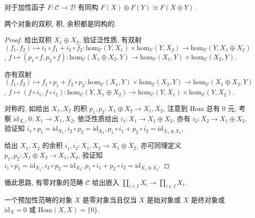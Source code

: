 \begin{lemma}
    对于加性函子 \(F : \mathcal{C} \to \mathcal{D}\) 有同构 \(F(X) \oplus F(Y) \cong F(X \oplus Y)\).
\end{lemma}

\begin{lemma}
    \label {lemma:coproduct product biproduct are isomorphic}
    两个对象的双积, 积, 余积都是同构的.

    \begin{proof}
        给出双积 \(X_1 \oplus X_2\), 验证泛性质, 有双射 \((f_1,f_2) \mapsto i_1 \circ f_1 + i_2 \circ f_2 : \mathrm{hom}_{\mathcal{C}} (Y,X_1) \times \mathrm{hom}_{\mathcal{C}} (Y,X_2) \to \mathrm{hom}_{\mathcal{C}} (Y,X_1 \oplus X_2)\),
        \(f \mapsto (p_1 \circ f, p_2 \circ f) : \mathrm{hom}_{\mathcal{C}} (X_1 \oplus X_2,Y) \to \mathrm{hom}_{\mathcal{C}} (X_1,Y) \times \mathrm{hom}_{\mathcal{C}} (X_2,Y)\).

        亦有双射 \((f_1,f_2) \mapsto f_1 \circ p_1 + f_2 \circ p_2 : \mathrm{hom}_{\mathcal{C}} (X_1,Y) \times \mathrm{hom}_{\mathcal{C}} (X_2,Y) \to \mathrm{hom}_{\mathcal{C}} (X_1 \oplus X_2,Y)\),
        \(f \mapsto (f \circ i_1, f \circ i_2) : \mathrm{hom}_{\mathcal{C}} (Y,X_1 \oplus X_2) \to \mathrm{hom}_{\mathcal{C}} (Y,X_1) \times \mathrm{hom}_{\mathcal{C}} (Y,X_2)\).

        对称的, 如给出 \(X_1,X_2\) 的积 \(p_1,p_2 : X_1 \oplus X_2 \to X_1,X_2\),
        注意到 \(\mathrm{Hom}\) 总有 \(0\) 元, 考察 \(\mathrm{id}_{X_1},0 : X_1 \to X_1,X_2\),
        依泛性质给出 \(i_1 : X_1 \to X_1 \oplus X_2\), 亦有 \(i_2 : X_2 \to X_1 \oplus X_2\),
        验证知 \(i_1 \circ p_1 = \mathrm{id}_{X_1}, i_2 \circ p_2 = \mathrm{id}_{X_2}, p_1 \circ i_1 + p_2 \circ i_2 = \mathrm{id}_{X_1 \oplus X_2}\),

        给出 \(X_1,X_2\) 的余积 \(i_1,i_2 : X_1,X_2 \to X_1 \oplus X_2\), 亦可同理定义 \(p_1,p_2 : X_1 \oplus X_2 \to X_1,X_2\),
        验证知 \(i_1 \circ p_1 = \mathrm{id}_{X_1}, i_2 \circ p_2 = \mathrm{id}_{X_2}, p_1 \circ i_1 + p_2 \circ i_2 = \mathrm{id}_{X_1 \oplus X_2}\).
    \end{proof}
\end{lemma}

\begin{remark}
    循此思路, 有零对象的范畴 \(\mathcal{C}\) 给出嵌入 \(\coprod_{i \in I} X_i \to \prod_{i \in I} X_i\).
\end{remark}

\begin{lemma}
    一个预加性范畴的对象 \(X\) 是零对象当且仅当 \(X\) 是始对象或 \(X\) 是终对象或
    \(\mathrm{id}_X = 0\) 或 \(\mathrm{Hom} (X,X) = \{0\}\).
\end{lemma}

